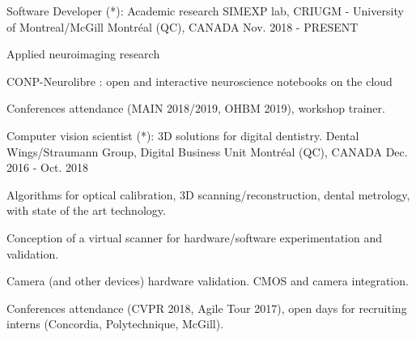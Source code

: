 


\begin{cventries}



\cventry
{Software Developer (*): Academic research}%
{SIMEXP lab, CRIUGM - University of Montreal/McGill} %
{\hspace{-5mm}Montréal (QC), CANADA} %
{Nov. 2018 - PRESENT} %
{ %
	\begin{cvitems}
		\item {Applied neuroimaging research}
		\item {CONP-Neurolibre : open and interactive neuroscience notebooks on the cloud}
		\item Conferences attendance (MAIN 2018/2019, OHBM 2019), workshop trainer.
	\end{cvitems}
}


\cventry
{Computer vision scientist (*): 3D solutions for digital dentistry.}%
{Dental Wings/Straumann Group, Digital Business Unit} %
{\hspace{-5mm}Montréal (QC), CANADA} %
{Dec. 2016 - Oct. 2018} %
{ %
\begin{cvitems}
\item {Algorithms for optical calibration, 3D scanning/reconstruction, dental metrology,  with state of the art technology.}
\item {Conception of a virtual scanner for hardware/software experimentation and validation.}
\item {Camera (and other devices) hardware validation. CMOS and camera integration.}
\item Conferences attendance (CVPR 2018, Agile Tour 2017), open days for recruiting interns (Concordia, Polytechnique, McGill).
\end{cvitems}
}


\end{cventries}
